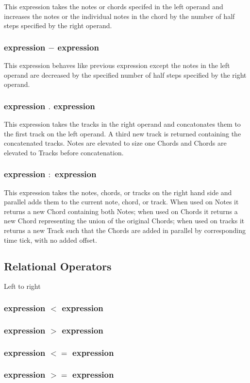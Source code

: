\documentclass[letterpaper]{article}
\begin{document}
This expression takes the notes or chords specifed in the left operand and increases the notes or the individual notes in the chord by the number of half steps specified by the right operand. 

\subsubsection{expression $-$ expression}
This expression behaves like previous expression except the notes in the left operand are decreased by the specified number of half steps specified by the right operand. 
\subsubsection{expression $.$ expression}
This expression takes the tracks in the right operand and concatonates them to the first track on the left operand. A third new track is returned containing the concatenated tracks. Notes are elevated to size one Chords and Chords are elevated to Tracks before concatenation. 
\subsubsection{expression $:$ expression}
This expression takes the notes, chords, or tracks on the right hand side and parallel adds them to the current note, chord, or track. When used on Notes it returns a new Chord containing both Notes; when used on Chords it returns a new Chord representing the union of the original Chords; when used on tracks it returns a new Track such that the Chords are added in parallel by corresponding time tick, with no added offset. 


\subsection{Relational Operators}
Left to right
\subsubsection{expression $<$ expression}
\subsubsection{expression $>$ expression}
\subsubsection{expression $<=$ expression}
\subsubsection{expression $>=$ expression}
\end{document}
